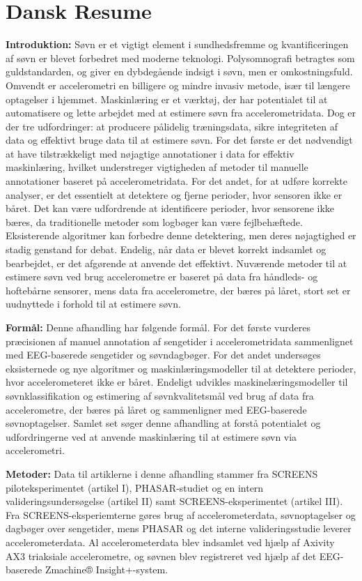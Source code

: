 \documentclass[
  10pt,
]{scrbook}
\let\originaltextbf\textbf
\renewcommand{\textbf}[1]{\textcolor{color1}{\originaltextbf{#1}}}
\begin{document}
\hypertarget{dansk-resume}{%
\chapter{Dansk Resume}\label{dansk-resume}}

\textbf{Introduktion:} Søvn er et vigtigt element i sundhedsfremme og
kvantificeringen af søvn er blevet forbedret med moderne teknologi.
Polysomnografi betragtes som guldstandarden, og giver en dybdegående
indsigt i søvn, men er omkostningsfuld. Omvendt er accelerometri en
billigere og mindre invasiv metode, især til længere optagelser i
hjemmet. Maskinlæring er et værktøj, der har potentialet til at
automatisere og lette arbejdet med at estimere søvn fra
accelerometridata. Dog er der tre udfordringer: at producere pålidelig
træningsdata, sikre integriteten af data og effektivt bruge data til at
estimere søvn. For det første er det nødvendigt at have tilstrækkeligt
med nøjagtige annotationer i data for effektiv maskinlæring, hvilket
understreger vigtigheden af metoder til manuelle annotationer baseret på
accelerometridata. For det andet, for at udføre korrekte analyser, er
det essentielt at detektere og fjerne perioder, hvor sensoren ikke er
båret. Det kan være udfordrende at identificere perioder, hvor sensorene
ikke bæres, da traditionelle metoder som logbøger kan være
fejlbehæftede. Eksisterende algoritmer kan forbedre denne detektering,
men deres nøjagtighed er stadig genstand for debat. Endelig, når data er
blevet korrekt indsamlet og bearbejdet, er det afgørende at anvende det
effektivt. Nuværende metoder til at estimere søvn ved brug accelerometre
er baseret på data fra håndleds- og hoftebårne sensorer, mens data fra
accelerometre, der bæres på låret, stort set er uudnyttede i forhold til
at estimere søvn.

\textbf{Formål:} Denne afhandling har følgende formål. For det første
vurderes præcisionen af manuel annotation af sengetider i
accelerometridata sammenlignet med EEG-baserede sengetider og
søvndagbøger. For det andet undersøges eksisternede og nye algoritmer og
maskinlæringsmodeller til at detektere perioder, hvor accelerometeret
ikke er båret. Endeligt udvikles maskinelæringsmodeller til
søvnklassifikation og estimering af søvnkvalitetsmål ved brug af data
fra accelerometre, der bæres på låret og sammenligner med EEG-baserede
søvnoptagelser. Samlet set søger denne afhandling at forstå potentialet
og udfordringerne ved at anvende maskinlæring til at estimere søvn via
accelerometri.

\textbf{Metoder:} Data til artiklerne i denne afhandling stammer fra
SCREENS piloteksperimentet (artikel I), PHASAR-studiet og en intern
valideringsundersøgelse (artikel II) samt SCREENS-eksperimentet (artikel
III). Fra SCREENS-eksperiemterne gøres brug af accelerometerdata,
søvnoptagelser og dagbøger over sengetider, mens PHASAR og det interne
valideringsstudie leverer accelerometerdata. Al accelerometerdata blev
indsamlet ved hjælp af Axivity AX3 triaksiale accelerometre, og søvnen
blev registreret ved hjælp af det EEG-baserede Zmachine®
Insight+-system.
\end{document}

